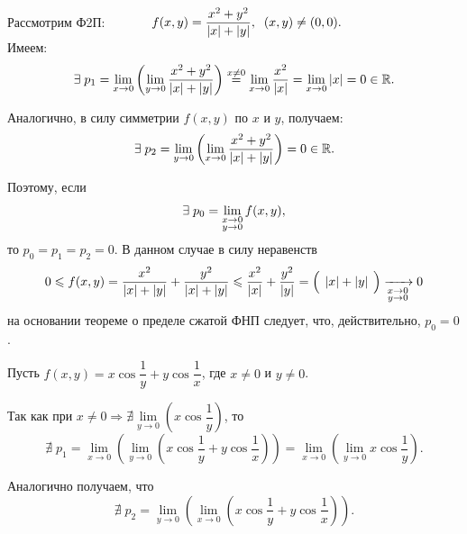 \begin{examples}
    \item Рассмотрим Ф2П:
    $ \;\;\;\;\;\;\;\;\;\;\;\;
        f(x,y) = \dfrac{x^2 + y^2}{\left\lvert x \right\rvert + \left\lvert y \right\rvert}, \;\; (x, y) \neq (0, 0).
    $\\
    Имеем:
    \begin{equation*}
    \exists \; p_1 = \lim\limits_{x \to 0} \left( \lim\limits_{y \to 0} \dfrac{x^2 + y^2}{\left\lvert x \right\rvert + \left\lvert y \right\rvert} \right) \overset{x \neq 0}{=}
    \lim\limits_{x \to 0} \dfrac{x^2}{\left\lvert x \right\rvert} = \lim\limits_{x \to 0} \left\lvert x \right\rvert = 0 \in \mathbb{R} .
    \end{equation*}

    Аналогично, в силу симметрии $ f(x, y) $ по $ x $ и $ y $, получаем:
    \begin{equation*}
        \exists \; p_2 =
        \lim\limits_{y \to 0} \left( \lim\limits_{x \to 0} \dfrac{x^2 + y^2}{\left\lvert x \right\rvert + \left\lvert y \right\rvert} \right)  =
        0 \in \mathbb{R}.
    \end{equation*}

    Поэтому, если
   \begin{equation*}
        \exists \; p_0 = \lim\limits_{ \substack{ x \to 0 \\ y \to 0 } } f(x,y),
   \end{equation*}
   то $ p_0 = p_1 = p_2 = 0$. В данном случае в силу неравенств
   \begin{equation*}
       0 \leqslant f(x,y) = \dfrac{x^2}{\left\lvert x \right\rvert + \left\lvert y \right\rvert} + \dfrac{y^2}{\left\lvert x \right\rvert + \left\lvert y \right\rvert} \leqslant
       \dfrac{x^2}{\left\lvert x \right\rvert} + \dfrac{y^2}{\left\lvert y \right\rvert} = \left( \dfrac{ }{} \left\lvert x \right\rvert + \left\lvert y \right\rvert \dfrac{ }{} \right) \xrightarrow[\substack{x \to 0 \\ y \to 0}]{} 0
   \end{equation*}
    на основании  теореме о пределе сжатой ФНП следует, что, действительно, $ p_0 = 0 $.

    \item Пусть  $ f(x,y) = x \cos \dfrac{1}{y} + y \cos \dfrac{1}{x}$, где $ x \neq 0 $ и $ y \neq 0 $.

    Так как при $ x \neq 0  \Rightarrow \nexists \lim\limits_{y \to 0} \left( x \cos \dfrac{1}{y} \right) $, то
    \begin{equation*}
        \nexists \; p_1 =
        \lim\limits_{x \to 0} \left( \lim\limits_{y \to 0} \left( x \cos \dfrac{1}{y} + y \cos \dfrac{1}{x} \right) \right)
        = \lim\limits_{x \to 0} \left( \lim\limits_{y \to 0} x \cos \dfrac{1}{y} \right) .
    \end{equation*}

    Аналогично получаем, что
    \begin{equation*}
    \nexists \; p_2 =
    \lim\limits_{y \to 0} \left( \lim\limits_{x \to 0} \left( x \cos \dfrac{1}{y} + y \cos \dfrac{1}{x} \right) \right) .
    \end{equation*}


\end{examples}
